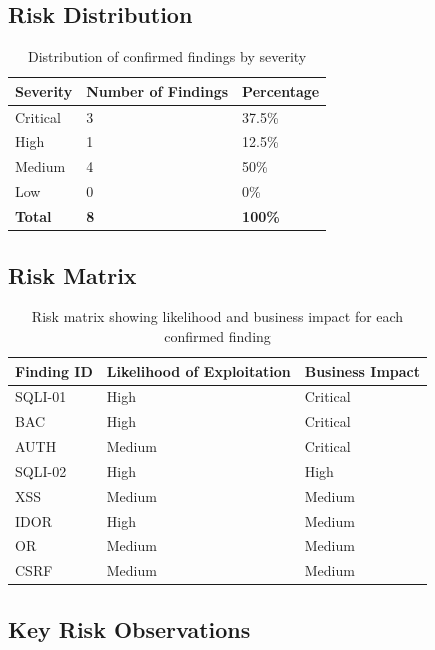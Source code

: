 \subsection*{Risk Distribution}

\begin{table}[H]
\centering
\begin{tabular}{|l|l|l|}
\hline
\textbf{Severity} & \textbf{Number of Findings} & \textbf{Percentage} \\
\hline
Critical & 3 & 37.5\% \\
\hline
High & 1 & 12.5\% \\
\hline
Medium & 4 & 50\% \\
\hline
Low & 0 & 0\% \\
\hline
\textbf{Total} & \textbf{8} & \textbf{100\%} \\
\hline
\end{tabular}
\caption{Distribution of confirmed findings by severity}
\end{table}

\subsection*{Risk Matrix}

\begin{table}[H]
\centering
\renewcommand{\arraystretch}{1.3}
\begin{tabular}{|l|l|l|}
\hline
\textbf{Finding ID} & \textbf{Likelihood of Exploitation} &
\textbf{Business Impact} \\
\hline
SQLI-01 & High & Critical \\
\hline
BAC & High & Critical \\
\hline
AUTH & Medium & Critical \\
\hline
SQLI-02 & High & High \\
\hline
XSS & Medium & Medium \\
\hline
IDOR & High & Medium \\
\hline
OR & Medium & Medium \\
\hline
CSRF & Medium & Medium \\
\hline
\end{tabular}
\caption{Risk matrix showing likelihood and business impact for each
confirmed finding}
\end{table}

\subsection*{Key Risk Observations}


